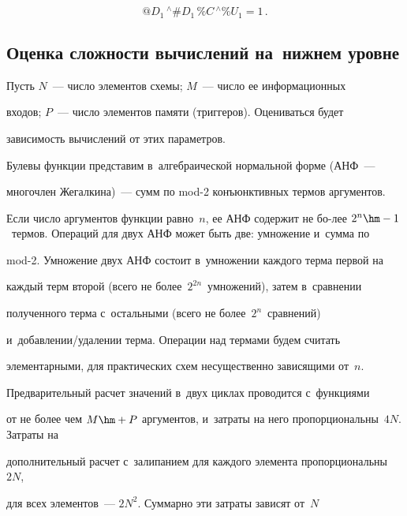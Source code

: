    $$


   @D_1 \,{}^{\wedge}\#D_1\, \%C \,{}^{\wedge}\%U_1 = 1\,.


   $$





\subsection{Оценка сложности вычислений на~нижнем уровне}


       


   Пусть $N$~--- число элементов схемы; $M$~--- число ее информационных 


входов; $P$~--- число элементов памяти (триггеров). Оцениваться будет 


зависимость вычислений от этих параметров.


   


   Булевы функции представим в~алгебраической нормальной форме (АНФ~--- 


многочлен Жегалкина)~--- сумм по mod-2 конъюнктивных термов аргументов. 


Если число аргументов функции равно~$n$, ее АНФ содержит не бо-\linebreak лее $2^n\hm-


1$~термов. Операций для двух АНФ может быть две: умножение и~сумма по 


mod-2. Умножение двух АНФ состоит в~умножении каждого терма первой на 


каждый терм второй (всего не более~$2^{2n}$~умножений), затем в~сравнении 


полученного терма с~остальными (всего не более~$2^n$~сравнений) 


и~до\-бав\-ле\-нии/уда\-ле\-нии терма. Операции над термами будем считать 


элементарными, для практических схем несущественно зависящими от~$n$.


   


   Предварительный расчет значений в~двух циклах проводится с~функциями 


от не более чем $M\hm+P$ аргументов, и~затраты на него пропорциональны~$4N$. Затраты на 


дополнительный расчет с~залипанием для каждого элемента пропорциональны~$2N$, 


для всех элементов~--- $2N^2$. Суммарно эти затраты зависят от~$N$ 


